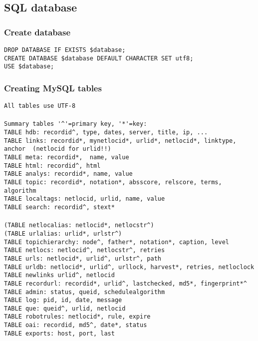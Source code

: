 \subsection{SQL database}
\label{sqlstruct}
\subsubsection{Create database}
\verb+DROP DATABASE IF EXISTS $database;+\\
\verb+CREATE DATABASE $database DEFAULT CHARACTER SET utf8;+\\
\verb+USE $database;+\\
\subsubsection{Creating MySQL tables}
\verb+All tables use UTF-8+\\
\verb++\\
\verb+Summary tables '^'=primary key, '*'=key:+\\
\verb+TABLE hdb: recordid^, type, dates, server, title, ip, ...+\\
\verb+TABLE links: recordid*, mynetlocid*, urlid*, netlocid*, linktype, anchor  (netlocid for urlid!!)+\\
\verb+TABLE meta: recordid*,  name, value+\\
\verb+TABLE html: recordid^, html+\\
\verb+TABLE analys: recordid*, name, value+\\
\verb+TABLE topic: recordid*, notation*, absscore, relscore, terms, algorithm+\\
\verb+TABLE localtags: netlocid, urlid, name, value+\\
\verb+TABLE search: recordid^, stext*+\\
\verb++\\
\verb+(TABLE netlocalias: netlocid*, netlocstr^)+\\
\verb+(TABLE urlalias: urlid*, urlstr^)+\\
\verb+TABLE topichierarchy: node^, father*, notation*, caption, level+\\
\verb+TABLE netlocs: netlocid^, netlocstr^, retries+\\
\verb+TABLE urls: netlocid*, urlid^, urlstr^, path+\\
\verb+TABLE urldb: netlocid*, urlid^, urllock, harvest*, retries, netloclock+\\
\verb+TABLE newlinks urlid^, netlocid+\\
\verb+TABLE recordurl: recordid*, urlid^, lastchecked, md5*, fingerprint*^+\\
\verb+TABLE admin: status, queid, schedulealgorithm+\\
\verb+TABLE log: pid, id, date, message+\\
\verb+TABLE que: queid^, urlid, netlocid+\\
\verb+TABLE robotrules: netlocid*, rule, expire+\\
\verb+TABLE oai: recordid, md5^, date*, status+\\
\verb+TABLE exports: host, port, last+\\
